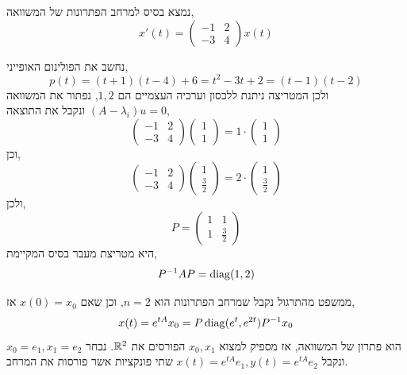 \question{}
\subquestion{}
נמצא בסיס למרחב הפתרונות של המשוואה,
\[
	x'(t)
	= \begin{pmatrix}
		-1 & 2 \\
		-3 & 4
	\end{pmatrix}
	x(t)
\]
\begin{solution}
	נחשב את הפולינום האופייני,
	\[
		p(t)
		= (t + 1)(t - 4) + 6
		= t^2 - 3t + 2
		= (t - 1)(t - 2)
	\]
	ולכן המטריצה ניתנת ללכסון וערכיה העצמיים הם $1, 2$,
	נפתור את המשוואה $(A - \lambda_i) u = 0$ ונקבל את התוצאה,
	\[
		\begin{pmatrix}
			-1 & 2 \\
			-3 & 4
		\end{pmatrix}
		\begin{pmatrix}
			1 \\
			1
		\end{pmatrix}
		=
		1 \cdot
		\begin{pmatrix}
			1 \\
			1
		\end{pmatrix}
	\]
	וכן,
	\[
		\begin{pmatrix}
			-1 & 2 \\
			-3 & 4
		\end{pmatrix}
		\begin{pmatrix}
			1 \\
			\frac{3}{2}
		\end{pmatrix}
		=
		2 \cdot
		\begin{pmatrix}
			1 \\
			\frac{3}{2}
		\end{pmatrix}
	\]
	ולכן,
	\[
		P
		= \begin{pmatrix}
			1 & 1 \\
			1 & \frac{3}{2}
		\end{pmatrix}
	\]
	היא מטריצת מעבר בסיס המקיימת,
	\[
		P^{-1} A P
		= \operatorname{diag}(1, 2)
	\]

	ממשפט מהתרגול נקבל שמרחב הפתרונות הוא $n = 2$, וכן שאם $x(0) = x_0$ אז,
	\[
		x(t)
		= e^{tA} x_0
		= P \operatorname{diag}(e^t, e^{2t}) P^{-1} x_0
	\]
	הוא פתרון של המשוואה, אז מספיק למצוא $x_0, x_1$ הפורסים את $\mathbb{R}^2$.
	נבחר $x_0 = e_1, x_1 = e_2$ ונקבל $x(t) = e^{tA} e_1, y(t) = e^{tA} e_2$ שתי פונקציות אשר פורסות את המרחב.
\end{solution}

